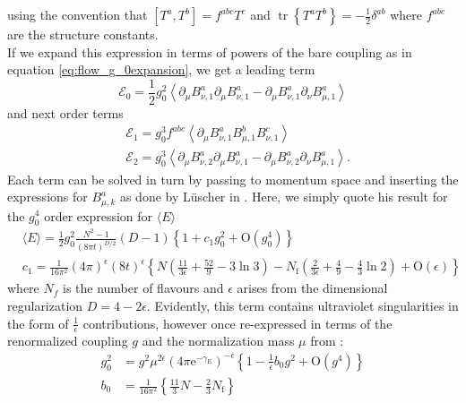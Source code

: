 \documentclass[a4paper,10pt]{book}
\begin{document}
using the convention that $\left[T^{a}, T^{b}\right]=f^{a b c} T^{c}$ and $\operatorname{tr}\left\{T^{a} T^{b}\right\}=-\frac{1}{2} \delta^{a b}$ where $f^{a b c}$ are the structure constants.\\If we expand this expression in terms of powers of the bare coupling as in equation \eqref{eq:flow_g_0expansion}, we get a leading term
\begin{equation}
\mathcal{E}_{0}=\frac{1}{2} g_{0}^{2}\left\langle\partial_{\mu} B_{\nu, 1}^{a} \partial_{\mu} B_{\nu, 1}^{a}-\partial_{\mu} B_{\nu, 1}^{a} \partial_{\nu} B_{\mu, 1}^{a}\right\rangle
\end{equation}
and next order terms
\begin{equation}
\begin{aligned}
&\mathcal{E}_{1}=g_{0}^{3} f^{a b c}\left\langle\partial_{\mu} B_{\nu, 1}^{a} B_{\mu, 1}^{b} B_{\nu, 1}^{c}\right\rangle \\
&\mathcal{E}_{2}=g_{0}^{3}\left\langle\partial_{\mu} B_{\nu, 2}^{a} \partial_{\mu} B_{\nu, 1}^{a}-\partial_{\mu} B_{\nu, 2}^{a} \partial_{\nu} B_{\mu, 1}^{a}\right\rangle.
\end{aligned}
\end{equation}
Each term can be solved in turn by passing to momentum space and inserting the expressions for $B_{\mu,k}^a$ as done by Lüscher in \cite{Luscher2010}. Here, we simply quote his result for the $g_0^4$ order expression for $\langle E \rangle$
\begin{equation}
\begin{aligned}
&\langle E\rangle=\frac{1}{2} g_{0}^{2} \frac{N^{2}-1}{(8 \pi t)^{D / 2}}(D-1)\left\{1+c_{1} g_{0}^{2}+\mathrm{O}\left(g_{0}^{4}\right)\right\} \\
&c_{1}=\frac{1}{16 \pi^{2}}(4 \pi)^{\epsilon}(8 t)^{\epsilon}\left\{N\left(\frac{11}{3 \epsilon}+\frac{52}{9}-3 \ln 3\right)-N_{\mathrm{f}}\left(\frac{2}{3 \epsilon}+\frac{4}{9}-\frac{4}{3} \ln 2\right)+\mathrm{O}(\epsilon)\right\}
\end{aligned}
\end{equation}
where $N_f$ is the number of flavours and $\epsilon$ arises from the dimensional regularization $D=4-2\epsilon$. Evidently, this term contains ultraviolet singularities in the form of $\frac{1}{\epsilon}$ contributions, however once re-expressed in terms of the renormalized coupling $g$ and the normalization mass $\mu$ from \cite{BardeenWilliamA.1978Dsbt}:
\begin{equation}
\begin{aligned}
g_{0}^{2} &=g^{2} \mu^{2 \epsilon}\left(4 \pi \mathrm{e}^{-\gamma_{\mathrm{E}}}\right)^{-\epsilon}\left\{1-\frac{1}{\epsilon} b_{0} g^{2}+\mathrm{O}\left(g^{4}\right)\right\} \\
b_{0} &=\frac{1}{16 \pi^{2}}\left\{\frac{11}{3} N-\frac{2}{3} N_{\mathrm{f}}\right\}
\end{aligned}
\end{equation}
\end{document}
